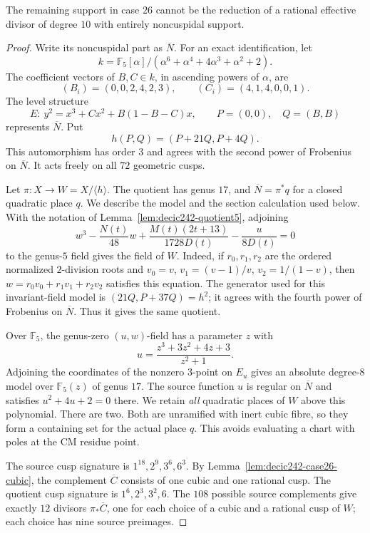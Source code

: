 \begin{lemma}\label{lem:decic242-last-support}
The remaining support in case $26$ cannot be the reduction of a
rational effective divisor of degree $10$ with entirely
noncuspidal support.
\end{lemma}
\begin{proof}
Write its noncuspidal part as $\overline N$.
For an exact identification, let
\[
 k=\mathbb F_5[\alpha]/
 (\alpha^6+\alpha^4+4\alpha^3+\alpha^2+2).
\]
The coefficient vectors of $B,C\in k$, in ascending powers of
$\alpha$, are
\[
 (B_i)=(0,0,2,4,2,3),\qquad(C_i)=(4,1,4,0,0,1).
\]
The level structure
\[
 E:\ y^2=x^3+Cx^2+B(1-B-C)x,\qquad P=(0,0),\quad Q=(B,B)
\]
represents $\overline N$.
Put
\[
 h(P,Q)=(P+21Q,P+4Q).
\]
This automorphism has order $3$ and agrees with the second power
of Frobenius on $\overline N$.
It acts freely on all $72$ geometric cusps.

Let $\pi:X\to W=X/\langle h\rangle$.
The quotient has genus $17$, and
$\overline N=\pi^*q$ for a closed quadratic place $q$.
We describe the model and the section calculation used below.
With the notation of Lemma~\ref{lem:decic242-quotient5}, adjoining
\[
 w^3-\frac{N(t)}{48}w+
 \frac{M(t)(2t+13)}{1728D(t)}-\frac{u}{8D(t)}=0
\]
to the genus-$5$ field gives the field of $W$.
Indeed, if $r_0,r_1,r_2$ are the ordered normalized $2$-division
roots and $v_0=v$, $v_1=(v-1)/v$, $v_2=1/(1-v)$, then
$w=r_0v_0+r_1v_1+r_2v_2$ satisfies this equation.
The generator used for this invariant-field model is
$(21Q,P+37Q)=h^2$; it agrees with the fourth power of Frobenius
on $\overline N$. Thus it gives the same quotient.

Over $\mathbb F_5$, the genus-zero $(u,w)$-field has a parameter
$z$ with
\[
 u=\frac{z^3+3z^2+4z+3}{z^2+1}.
\]
Adjoining the coordinates of the nonzero $3$-point on $E_u$
gives an absolute degree-$8$ model over $\mathbb F_5(z)$ of
genus $17$.
The source function $u$ is regular on $\overline N$ and satisfies
$u^2+4u+2=0$ there.
We retain \emph{all} quadratic places of $W$ above this polynomial.
There are two. Both are unramified with inert cubic fibre, so
they form a containing set for the actual place $q$.
This avoids evaluating a chart with poles at the CM residue point.

The source cusp signature is $1^{18},2^9,3^6,6^3$.
By Lemma~\ref{lem:decic242-case26-cubic}, the complement
$\overline C$ consists of one cubic and one rational cusp.
The quotient cusp signature is $1^6,2^3,3^2,6$.
The $108$ possible source complements give exactly $12$ divisors
$\pi_*\overline C$, one for each choice of a cubic and a rational
cusp of $W$; each choice has nine source preimages.


\end{proof}
